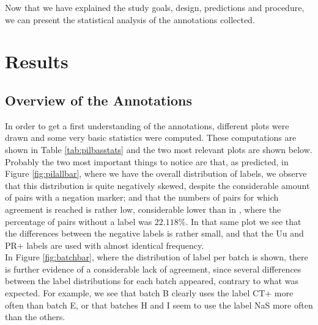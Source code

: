 Now that we have explained the study goals, design, predictions and procedure, we can present the statistical analysis of the annotations collected.\\

\section{Results}
\subsection{Overview of the Annotations}
\label{subsect:piloverview}
In order to get a first understanding of the annotations, different plots were drawn and some very basic statistics were computed. These computations are shown in Table \ref{tab:pilbasstats} and the two most relevant plots are shown below. Probably the two most important things to notice are that, as predicted, in Figure \ref{fig:pilallbar}, where we have the overall distribution of labels, we observe that this distribution is quite negatively skewed, despite the considerable amount of pairs with a negation marker; and that the numbers of pairs for which agreement is reached is rather low, considerable lower than in \citet{de2012did}, where the percentage of pairs without a label was $22.118\%$. In that same plot we see that the differences between the negative labels is rather small, and that the Uu and PR+ labels are used with almost identical frequency.\\ 

In Figure \ref{fig:batchbar}, where the distribution of label per batch is shown, there is further evidence of a considerable lack of agreement, since several differences between the label distributions for each batch appeared, contrary to what was expected. For example, we see that batch B clearly uses the label CT+ more often than batch E, or that batches H and I seem to use the label NaS more often than the others.\\

